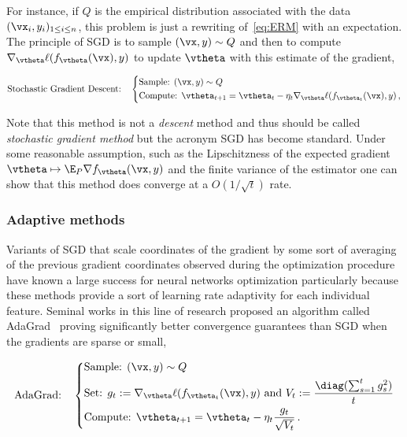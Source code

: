 For instance, if $Q$ is the empirical distribution associated with the data $(\vx_i,y_i)_{1\leq i\leq n}$, this problem is just a rewriting of~\eqref{eq:ERM} with an expectation. The principle of SGD is to sample $(\vx,y)\sim Q$ and then to compute $\nabla_\vtheta \ell(f_\vtheta(\vx),y)$ to update $\vtheta$ with this estimate of the gradient,

\begin{equation}
\text{Stochastic Gradient Descent:} \quad 
\left\{
\begin{aligned}
&\text{Sample: } (\vx,y)\sim Q \\
&\text{Compute: } \vtheta_{t+1} = \vtheta_t - \eta_t \nabla_\vtheta \ell(f_{\vtheta_t}(\vx),y) \,,
\end{aligned}
\right.
\end{equation}

Note that this method is not a \emph{descent} method and thus should be called \emph{stochastic gradient method} but the acronym SGD has become standard. Under some reasonable assumption, such as the Lipschitzness of the expected gradient $\vtheta \mapsto \E_P \nabla f_{\vtheta}(\vx,y)$ and the finite variance of the estimator one can show that this method does converge at a $O(1/\sqrt{t})$ rate. 




\subsubsection{Adaptive methods}




Variants of SGD that scale coordinates of the gradient by some sort of averaging of the previous gradient coordinates observed during the optimization procedure have known a large success for neural networks optimization particularly because these methods provide a sort of learning rate adaptivity for each individual feature. Seminal works in this line of research proposed an algorithm called AdaGrad~\citep{duchi2011adaptive} proving significantly better convergence guarantees than SGD when the gradients are sparse or small,

\begin{equation}
\text{AdaGrad:} \quad 
\left\{
\begin{aligned}
&\text{Sample: } (\vx,y)\sim Q \\
&\text{Set: } g_t := \nabla_\vtheta \ell(f_{\vtheta_t}(\vx),y) \text{ and } V_t := \frac{\diag(\sum_{s=1}^t g_s^2)}{t} \\
&\text{Compute: } \vtheta_{t+1} = \vtheta_t - \eta_t \frac{g_t}{\sqrt{V_t}} \,.
\end{aligned}
\right.
\end{equation}

